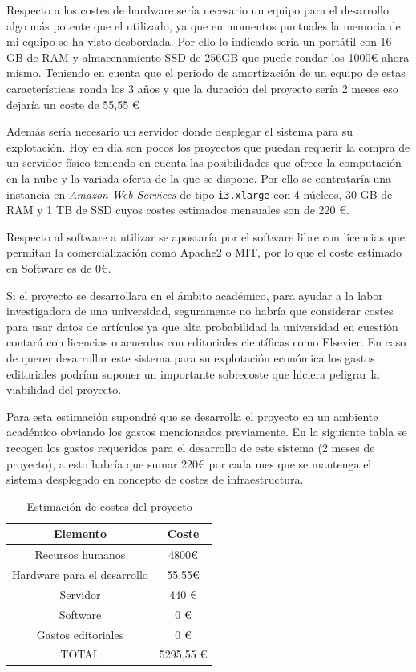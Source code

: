 Respecto a los costes de hardware sería necesario un equipo para el desarrollo algo más potente que el utilizado, ya que en momentos puntuales la memoria de mi equipo se ha visto desbordada.
Por ello lo indicado sería un portátil con 16 GB de RAM y almacenamiento SSD de 256GB que puede rondar los 1000€ ahora mismo. Teniendo en cuenta que el periodo de amortización de un equipo de estas características ronda los 3 años y que la duración del proyecto sería 2 meses eso dejaría un coste de 55,55 €

Además sería necesario un servidor donde desplegar el sistema para su explotación. Hoy en día son pocos los proyectos que puedan requerir la compra de un servidor físico teniendo en cuenta las posibilidades que ofrece la computación en la nube y la variada oferta de la que se dispone. Por ello se contrataría una instancia en \textit{Amazon Web Services} de tipo \texttt{i3.xlarge} con 4 núcleos, 30 GB de RAM y 1 TB de SSD cuyos costes estimados mensuales son de 220 €.

Respecto al software a utilizar se apostaría por el software libre con licencias que permitan la comercialización como Apache2 o MIT, por lo que el coste estimado en Software es de 0€.

Si el proyecto se desarrollara en el ámbito académico, para ayudar a la labor investigadora de una universidad, seguramente no habría que considerar costes para usar datos de artículos ya que alta probabilidad la universidad en cuestión contará con licencias o acuerdos con editoriales científicas como Elsevier. En caso de querer desarrollar este sistema para su explotación económica los gastos editoriales podrían suponer un importante sobrecoste que hiciera peligrar la viabilidad del proyecto.

Para esta estimación supondré que se desarrolla el proyecto en un ambiente académico obviando los gastos mencionados previamente. En la siguiente tabla se recogen los gastos requeridos para el desarrollo de este sistema (2 meses de proyecto), a esto habría que sumar 220€ por cada mes que se mantenga el sistema desplegado en concepto de costes de infraestructura.

\begin{table} [h!]
	\centering
	\begin{tabular}{| c | c |}
		\hline
		\textbf{Elemento}      & \textbf{Coste} \\ \hline
		Recursos humanos       & 4800€          \\
		Hardware para el desarrollo & 55,55€         \\
		Servidor           & 440 €          \\
		Software           & 0 €            \\
		Gastos editoriales      & 0 €            \\ \hline
		TOTAL & 5295,55 € \\ \hline
	\end{tabular}
	\caption{Estimación de costes del proyecto}
\end{table}


